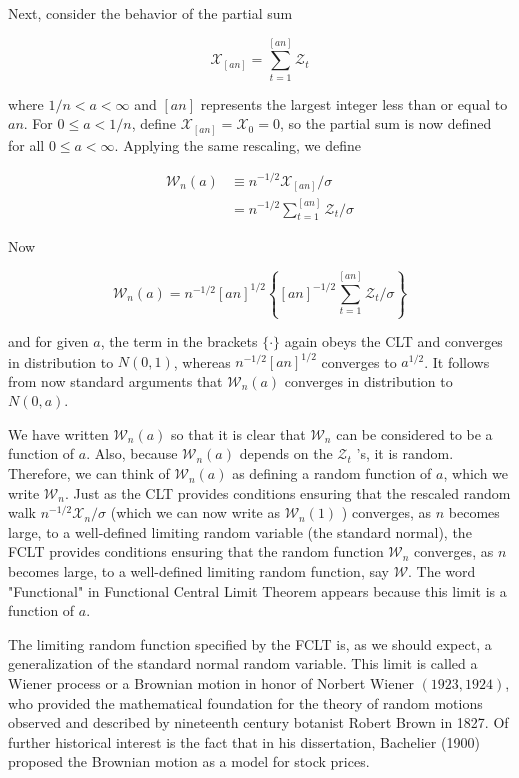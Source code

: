 \documentclass[10pt]{article}
\begin{document}
Next, consider the behavior of the partial sum

$$
\mathcal{X}_{[a n]}=\sum_{t=1}^{[a n]} \mathcal{Z}_{t}
$$

where $1 / n<a<\infty$ and $[a n]$ represents the largest integer less than or equal to $a n$. For $0 \leq a<1 / n$, define $\mathcal{X}_{[a n]}=\mathcal{X}_{0}=0$, so the partial sum is now defined for all $0 \leq a<\infty$. Applying the same rescaling, we define

$$
\begin{aligned}
\mathcal{W}_{n}(a) & \equiv n^{-1 / 2} \mathcal{X}_{[a n]} / \sigma \\
& =n^{-1 / 2} \sum_{t=1}^{[a n]} \mathcal{Z}_{t} / \sigma
\end{aligned}
$$

Now

$$
\mathcal{W}_{n}(a)=n^{-1 / 2}[a n]^{1 / 2}\left\{[a n]^{-1 / 2} \sum_{t=1}^{[a n]} \mathcal{Z}_{t} / \sigma\right\}
$$

and for given $a$, the term in the brackets $\{\cdot\}$ again obeys the CLT and converges in distribution to $N(0,1)$, whereas $n^{-1 / 2}[a n]^{1 / 2}$ converges to $a^{1 / 2}$. It follows from now standard arguments that $\mathcal{W}_{n}(a)$ converges in distribution to $N(0, a)$.

We have written $\mathcal{W}_{n}(a)$ so that it is clear that $\mathcal{W}_{n}$ can be considered to be a function of $a$. Also, because $\mathcal{W}_{n}(a)$ depends on the $\mathcal{Z}_{t}$ 's, it is random. Therefore, we can think of $\mathcal{W}_{n}(a)$ as defining a random function of $a$, which we write $\mathcal{W}_{n}$. Just as the CLT provides conditions ensuring that the rescaled random walk $n^{-1 / 2} \mathcal{X}_{n} / \sigma$ (which we can now write as $\mathcal{W}_{n}(1)$ ) converges, as $n$ becomes large, to a well-defined limiting random variable (the standard normal), the FCLT provides conditions ensuring that the random function $\mathcal{W}_{n}$ converges, as $n$ becomes large, to a well-defined limiting random function, say $\mathcal{W}$. The word "Functional" in Functional Central Limit Theorem appears because this limit is a function of $a$.

The limiting random function specified by the FCLT is, as we should expect, a generalization of the standard normal random variable. This limit is called a Wiener process or a Brownian motion in honor of Norbert Wiener $(1923,1924)$, who provided the mathematical foundation for the theory of random motions observed and described by nineteenth century botanist Robert Brown in 1827. Of further historical interest is the fact that in his dissertation, Bachelier (1900) proposed the Brownian motion as a model for stock prices.
\end{document}
